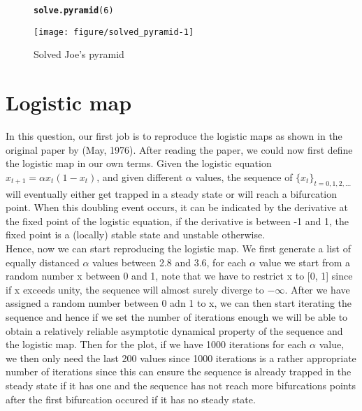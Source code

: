 \documentclass[12pt]{article}\usepackage[]{graphicx}\usepackage[]{color}
\makeatletter
\newcommand{\hlnum}[1]{\textcolor[rgb]{0.686,0.059,0.569}{#1}}%
\newcommand{\hlstd}[1]{\textcolor[rgb]{0.345,0.345,0.345}{#1}}%
\newcommand{\hlkwd}[1]{\textcolor[rgb]{0.737,0.353,0.396}{\textbf{#1}}}%
\newenvironment{kframe}{%
 \def\at@end@of@kframe{}%
 \ifinner\ifhmode%
  \def\at@end@of@kframe{\end{minipage}}%
  \begin{minipage}{\columnwidth}%
 \fi\fi%
 \def\FrameCommand##1{\hskip\@totalleftmargin \hskip-\fboxsep
 \colorbox{shadecolor}{##1}\hskip-\fboxsep
     \hskip-\linewidth \hskip-\@totalleftmargin \hskip\columnwidth}%
 \MakeFramed {\advance\hsize-\width
   \@totalleftmargin\z@ \linewidth\hsize
   \@setminipage}}%
 {\par\unskip\endMakeFramed%
 \at@end@of@kframe}
\newenvironment{knitrout}{}{} %
\makeatother
\begin{document}
\begin{figure}
\begin{center}
\begin{knitrout}
\color{fgcolor}\begin{kframe}
\begin{alltt}
\hlkwd{solve.pyramid}\hlstd{(}\hlnum{6}\hlstd{)}
\end{alltt}
\end{kframe}
\texttt{[image: figure/solved\_pyramid-1]} 

\end{knitrout}
\caption{Solved Joe's pyramid}
\label{fig:five}
\end{center}
\end{figure}


\section{Logistic map}
In this question, our first job is to reproduce the logistic maps as shown in the original paper by (May, 1976). After reading the paper, we could now first define the logistic map in our own terms. Given the logistic equation $x_{t+1} = \alpha x_{t}(1-x_{t})$, and given different $\alpha$ values, the sequence of $\{x_{t}\}_{t = 0, 1, 2, ...}$ will eventually either get trapped in a steady state or will reach a bifurcation point. When this doubling event occurs, it can be indicated by the derivative at the fixed point of the logistic equation, if the derivative is between -1 and 1, the fixed point is a (locally) stable state and unstable otherwise.\\
Hence, now we can start reproducing the logistic map. We first generate a list of equally distanced $\alpha$ values between 2.8 and 3.6, for each $\alpha$ value we start from a random number x between 0 and 1, note that we have to restrict x to [0, 1] since if x exceeds unity, the sequence will almost surely diverge to $-\infty$. After we have assigned a random number between 0 adn 1 to x, we can then start iterating the sequence and hence if we set the number of iterations enough we will be able to obtain a relatively reliable asymptotic dynamical property of the sequence and the logistic map. Then for the plot, if we have 1000 iterations for each $\alpha$ value, we then only need the last 200 values since 1000 iterations is a rather appropriate number of iterations since this can ensure the sequence is already trapped in the steady state if it has one and the sequence has not reach more bifurcations points after the first bifurcation occured if it has no steady state.\\
\end{document}
